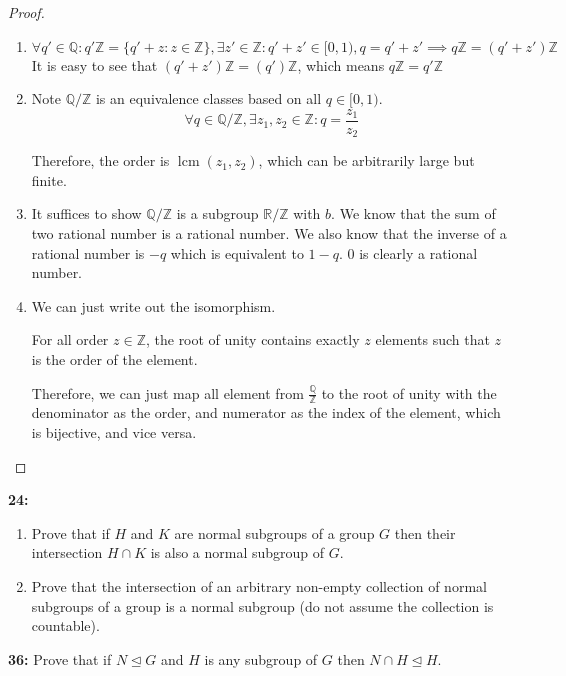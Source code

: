 \documentclass[11pt]{article}
\newcommand{\Q}{\mathbb{Q}}
\newcommand{\R}{\mathbb{R}}
\newcommand{\Z}{\mathbb{Z}}
\newenvironment{exercise}[1]
	{\noindent \textbf{#1:}}
	{\par \vspace{0.5\baselineskip}}
\begin{document}
\begin{proof}
	\begin{enumerate}[label=\emph{\alph*}]
		\item \[
			      \forall q' \in \Q: q'\Z = \{q'+z : z \in \Z\}, \exists z' \in \Z: q'+z' \in [0,1), q = q'+z' \implies q\Z = (q'+z')\Z
		      \]
		      It is easy to see that $(q'+z')\Z = (q')\Z$, which means $q\Z=q'\Z$
		\item Note $\Q/\Z$ is an equivalence classes based on all $q \in [0,1)$.
		      \[
			      \forall q \in \Q/\Z, \exists z_1,z_2 \in \Z: q = \frac{z_1}{z_2}
		      \]

		      Therefore, the order is $\operatorname{lcm} (z_1,z_2)$, which can be arbitrarily large but finite.

		\item It suffices to show $\Q/\Z$ is a subgroup $\R/\Z$ with $b$.
		      We know that the sum of two rational number is a rational number.
		      We also know that the inverse of a rational number is $-q$ which is equivalent to $1-q$.
		      $0$ is clearly a rational number.
		\item We can just write out the isomorphism.

		      For all order $z \in \Z$, the root of unity contains exactly $z$ elements such that $z$ is the order of the element.

			  Therefore, we can just map all element from $\frac{\Q}{\Z}$ to the root of unity with the denominator as the order,
			  and numerator as the index of the element, which is bijective, and vice versa.

	\end{enumerate}
\end{proof}

\begin{exercise}{24}
	\begin{enumerate}
		\item \textsf{Prove that if \(H\) and \(K\) are normal subgroups of a group \(G\) then their intersection \(H \cap K\) is also a normal subgroup of \(G\).}
		\item \textsf{Prove that the intersection of an arbitrary non-empty collection of normal subgroups of a group is a normal subgroup (do not assume the collection is countable).}
	\end{enumerate}
\end{exercise}{}

\begin{exercise}{36}
	\textsf{Prove that if \(N \trianglelefteq G\) and \(H\) is any subgroup of \(G\) then \(N \cap H \trianglelefteq H\).}
\end{exercise}{}
\end{document}
